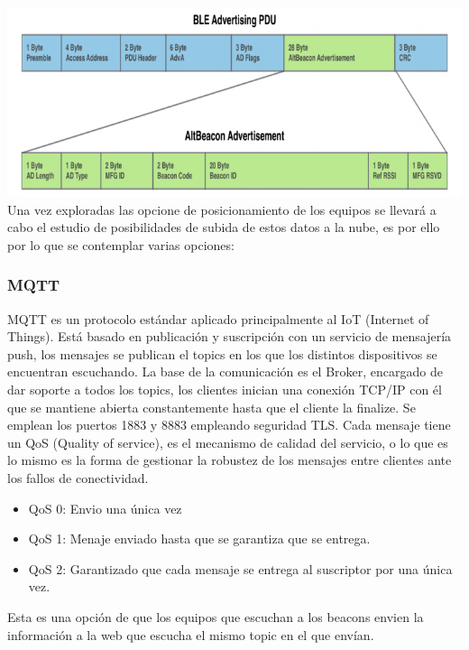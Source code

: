 \documentclass[a4paper ,12pt, onecolumn]{article}
\begin{document}
\begin{enumerate}
                \paragraph{}
                \includegraphics[scale=0.5]{tipos_beacon_altbeacon.PNG}
            Una vez exploradas las opcione de posicionamiento de los equipos se llevará a cabo el estudio de posibilidades de subida de estos datos
            a la nube, es por ello por lo que se contemplar varias opciones:
        \subsubsection {MQTT}
            MQTT es un protocolo estándar aplicado principalmente al IoT (Internet of Things). Está basado en publicación y 
            suscripción con un servicio de mensajería push, los mensajes se publican el topics en los que los distintos 
            dispositivos se encuentran escuchando.
            La base de la comunicación es el Broker, encargado de dar soporte a todos los topics, los clientes inician una 
            conexión TCP/IP con él que se mantiene abierta constantemente hasta que el cliente la finalize. Se emplean los puertos
            1883 y 8883 empleando seguridad TLS.
            Cada mensaje tiene un QoS (Quality of service), es el mecanismo de calidad del servicio, o lo que es lo mismo es la forma de
            gestionar la robustez de los mensajes entre clientes ante los fallos de conectividad.
            \begin{itemize}
                \item QoS 0: Envio una única vez
                \item QoS 1: Menaje enviado hasta que se garantiza que se entrega.
                \item QoS 2: Garantizado que cada mensaje se entrega al suscriptor por una única vez.
            \end{itemize}
            Esta es una opción de que los equipos que escuchan a los beacons envien la información a la web que escucha el mismo
            topic en el que envían.

\end{enumerate}
\end{document}
